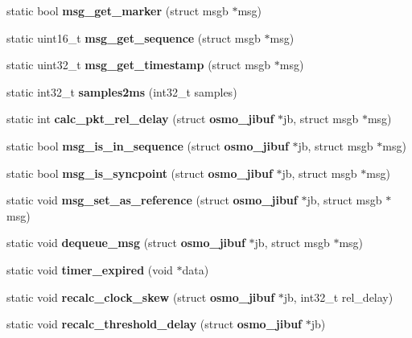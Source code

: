 \begin{DoxyCompactItemize}
\item 
static bool {\bfseries msg\+\_\+get\+\_\+marker} (struct msgb $\ast$msg)\label{group__jibuf_gac04feb6a6a10ab18535b5b298749d2a7}

\item 
static uint16\+\_\+t {\bfseries msg\+\_\+get\+\_\+sequence} (struct msgb $\ast$msg)\label{group__jibuf_ga567cebefb1fc599c620ae932ffd55c77}

\item 
static uint32\+\_\+t {\bfseries msg\+\_\+get\+\_\+timestamp} (struct msgb $\ast$msg)\label{group__jibuf_ga0541c14d964074796f1d181a6306c15c}

\item 
static int32\+\_\+t {\bfseries samples2ms} (int32\+\_\+t samples)\label{group__jibuf_ga96cb770599d21f38099c1925dc6414b7}

\item 
static int {\bfseries calc\+\_\+pkt\+\_\+rel\+\_\+delay} (struct {\bf osmo\+\_\+jibuf} $\ast$jb, struct msgb $\ast$msg)\label{group__jibuf_gacf7444e6e5f9f632425686578e0a8665}

\item 
static bool {\bfseries msg\+\_\+is\+\_\+in\+\_\+sequence} (struct {\bf osmo\+\_\+jibuf} $\ast$jb, struct msgb $\ast$msg)\label{group__jibuf_ga9616ede3a77dcf5b9b92afb49fb84b0c}

\item 
static bool {\bfseries msg\+\_\+is\+\_\+syncpoint} (struct {\bf osmo\+\_\+jibuf} $\ast$jb, struct msgb $\ast$msg)\label{group__jibuf_ga13ff8fac8aa58f0fb78b57b9aed543bd}

\item 
static void {\bfseries msg\+\_\+set\+\_\+as\+\_\+reference} (struct {\bf osmo\+\_\+jibuf} $\ast$jb, struct msgb $\ast$msg)\label{group__jibuf_ga80e283f02b6ee070797086248b5a3ead}

\item 
static void {\bfseries dequeue\+\_\+msg} (struct {\bf osmo\+\_\+jibuf} $\ast$jb, struct msgb $\ast$msg)\label{group__jibuf_gaf792656565ee3b2bf2ee251291c3ac9c}

\item 
static void {\bfseries timer\+\_\+expired} (void $\ast$data)\label{group__jibuf_gac7e6f4d0a197dd16d127f23c65afde57}

\item 
static void {\bfseries recalc\+\_\+clock\+\_\+skew} (struct {\bf osmo\+\_\+jibuf} $\ast$jb, int32\+\_\+t rel\+\_\+delay)\label{group__jibuf_ga039443c7bc682dc3ab6403fdd1ca1be2}

\item 
static void {\bfseries recalc\+\_\+threshold\+\_\+delay} (struct {\bf osmo\+\_\+jibuf} $\ast$jb)\label{group__jibuf_ga18e8f5a8c921b9bd3f684187add832cd}

\end{DoxyCompactItemize}
